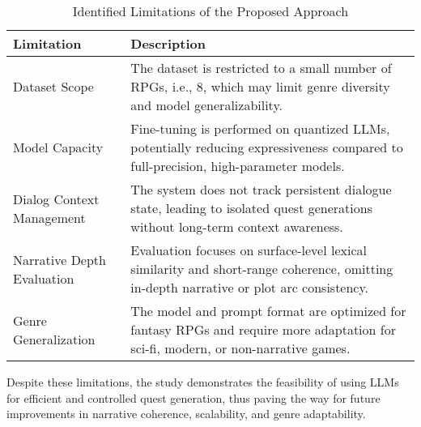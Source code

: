 \noindent
\begin{table}[H]
  \centering
  \scriptsize
  \renewcommand{\arraystretch}{1.3}
  \begin{tabularx}{0.95\textwidth}{
    >{\raggedright\arraybackslash}p{5cm}
    >{\raggedright\arraybackslash}X
  }
    \toprule
    \textbf{Limitation} & \textbf{Description} \\
    \midrule
    Dataset Scope
      & The dataset is restricted to a small number of RPGs, i.e., 8, which may limit genre diversity and model generalizability. \\
    Model Capacity
      & Fine-tuning is performed on quantized LLMs, potentially reducing expressiveness compared to full-precision, high-parameter models. \\
    Dialog Context Management
      & The system does not track persistent dialogue state, leading to isolated quest generations without long-term context awareness. \\
    Narrative Depth Evaluation
      & Evaluation focuses on surface-level lexical similarity and short-range coherence, omitting in-depth narrative or plot arc consistency. \\
    Genre Generalization
      & The model and prompt format are optimized for fantasy RPGs and require more adaptation for sci-fi, modern, or non-narrative games. \\
    \bottomrule
  \end{tabularx}
  \caption{Identified Limitations of the Proposed Approach}
\end{table}

Despite these limitations, the study demonstrates the feasibility of using LLMs for efficient
and controlled quest generation, thus paving the way for future improvements in narrative
coherence, scalability, and genre adaptability.

\newpage
